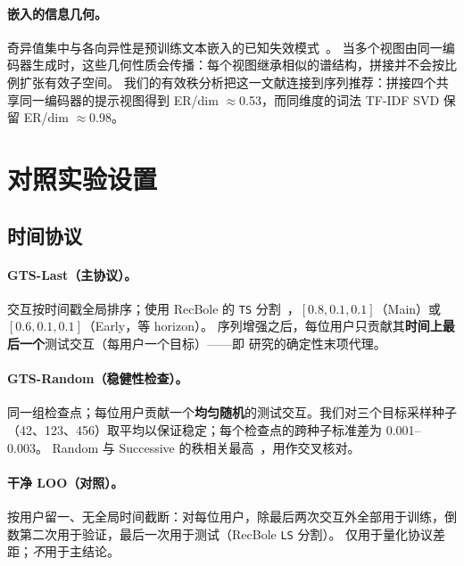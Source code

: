 \documentclass[sigconf,natbib=true,anonymous]{acmart}
\newcommand{\tfidf}{\textsc{TF-IDF}\xspace}
\begin{document}
\paragraph{嵌入的信息几何。}
奇异值集中与各向异性是预训练文本嵌入的已知失效模式~\cite{ethayarajh2019contextual}。
当多个视图由同一编码器生成时，这些几何性质会传播：每个视图继承相似的谱结构，拼接并不会按比例扩张有效子空间。
我们的有效秩分析把这一文献连接到序列推荐：拼接四个共享同一编码器的提示视图得到 ER/dim $\approx$0.53，而同维度的词法 \tfidf SVD 保留 ER/dim $\approx$0.98。

\section{对照实验设置}
\label{sec:setup}

\subsection{时间协议}
\label{sec:protocol}

\paragraph{GTS-Last（主协议）。}
交互按时间戳全局排序；使用 RecBole 的 \texttt{TS} 分割~\cite{zhao2021recbole}，$[0.8,0.1,0.1]$（Main）或 $[0.6,0.1,0.1]$（Early，等 horizon）。
序列增强之后，每位用户只贡献其\textbf{时间上最后一个}测试交互（每用户一个目标）——即 \citet{gusak2025time} 研究的确定性末项代理。

\paragraph{GTS-Random（稳健性检查）。}
同一组检查点；每位用户贡献一个\textbf{均匀随机}的测试交互。我们对三个目标采样种子（42、123、456）取平均以保证稳定；每个检查点的跨种子标准差为 0.001--0.003。
Random 与 Successive 的秩相关最高~\cite{gusak2025time}，用作交叉核对。

\paragraph{干净 LOO（对照）。}
按用户留一、无全局时间截断：对每位用户，除最后两次交互外全部用于训练，倒数第二次用于验证，最后一次用于测试（RecBole \texttt{LS} 分割）。
仅用于量化协议差距；\emph{不}用于主结论。
\end{document}
